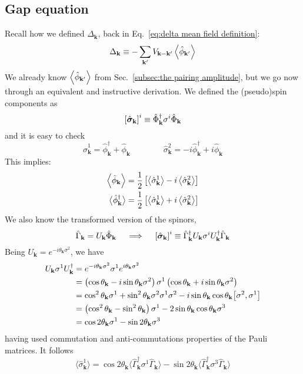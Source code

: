 \subsection{Gap equation}\label{subsec:gap equation}

Recall how we defined $\Delta_\mathbf{k}$, back in Eq.~\eqref{eq:delta mean field definition}:
\[
	\Delta_\mathbf{k} \equiv - \sum_{\mathbf{k}'} V_{\mathbf{k}-\mathbf{k}'} \ev{\hat{\phi}_{\mathbf{k}'}}
\]
We already know $\ev{\hat{\phi}_{\mathbf{k}'}}$ from Sec.~\ref{subsec:the pairing amplitude}, but we go now through an equivalent and instructive derivation. We defined the (pseudo)spin components as
\[
	\left[{\hat{\bm{\sigma}}_\mathbf{k}}\right]^i \equiv \hat{\Phi}_\mathbf{k}^\dagger \sigma^i \hat{\Phi}_\mathbf{k}
\]
and it is easy to check
\[
	\hat{\sigma}_\mathbf{k}^1 = \hat{\phi}_\mathbf{k}^\dagger + \hat{\phi}_\mathbf{k}
	\qquad\qquad
	\hat{\sigma}_\mathbf{k}^2 = -i \hat{\phi}_\mathbf{k}^\dagger + i \hat{\phi}_\mathbf{k}
\]
This implies:
\begin{align}
	\ev{\hat{\phi}_\mathbf{k}} = \frac{1}{2} \lrS{ \big\langle \hat{\sigma}_\mathbf{k}^1 \big\rangle - i \ev{\hat{\sigma}_\mathbf{k}^2} } \label{eq:unpairing expectation value via pseudospin} \\
	\big\langle \hat{\phi}_\mathbf{k}^\dagger \big\rangle = \frac{1}{2} \lrS{ \big\langle \hat{\sigma}_\mathbf{k}^1 \big\rangle + i \ev{\hat{\sigma}_\mathbf{k}^2} } \label{eq:pairing expectation value via pseudospin}
\end{align}
We also know the transformed version of the spinors,
\[
	\hat{\Gamma}_\mathbf{k} = U_\mathbf{k} \hat{\Phi}_\mathbf{k}
	\quad\implies\quad
	\left[{\hat{\bm{\sigma}}_\mathbf{k}}\right]^i \equiv \hat{\Gamma}_\mathbf{k}^\dagger U_\mathbf{k} \sigma^i U_\mathbf{k}^\dagger \hat{\Gamma}_\mathbf{k}
\]
Being $U_\mathbf{k} = e^{-i \theta_\mathbf{k} \sigma^2}$, we have
\[
\begin{aligned}
	U_\mathbf{k} \sigma^1 U_\mathbf{k}^\dagger &= e^{-i \theta_\mathbf{k} \sigma^2} \sigma^1 e^{i \theta_\mathbf{k} \sigma^2} \\
	&= \lrR{\cos\theta_\mathbf{k}-i\sin\theta_\mathbf{k}\sigma^2} \sigma^1 \lrR{\cos\theta_\mathbf{k}+i\sin\theta_\mathbf{k}\sigma^2} \\
	&= \cos^2 \theta_\mathbf{k} \sigma^1 + \sin^2 \theta_\mathbf{k} \sigma^2 \sigma^1 \sigma^2 - i \sin\theta_\mathbf{k} \cos\theta_\mathbf{k} \comm{\sigma^2}{\sigma^1} \\
	&= \lrR{\cos^2 \theta_\mathbf{k} - \sin^2 \theta_\mathbf{k}} \sigma^1 - 2 \sin \theta_\mathbf{k} \cos \theta_\mathbf{k} \sigma^3 \\
	&= \cos 2\theta_\mathbf{k} \sigma^1 - \sin 2\theta_\mathbf{k} \sigma^3
\end{aligned}
\]
having used commutation and anti-commutations properties of the Pauli matrices. It follows
\[
	\big\langle \hat{\sigma}_\mathbf{k}^1 \big\rangle = \cos 2\theta_\mathbf{k} \big\langle \hat{\Gamma}_\mathbf{k}^\dagger \sigma^1 \hat{\Gamma}_\mathbf{k} \big\rangle - \sin 2\theta_\mathbf{k} \big\langle \hat{\Gamma}_\mathbf{k}^\dagger \sigma^3 \hat{\Gamma}_\mathbf{k} \big\rangle
\]

